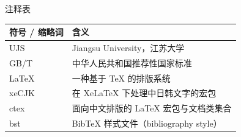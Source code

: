 
\clearpage
{}%
\thispagestyle{ujs@front}%
{}

\begin{center}
  \vspace{0.5\baselineskip}
  {\heiti{}注\hspace{1em}释\hspace{1em}表}
\end{center}
\par\vspace{\baselineskip}

\noindent
{\songti{}
  \renewcommand{\arraystretch}{1.3}%
  \begin{tabularx}{\textwidth}{@{}lL@{}}
    \toprule
    \textbf{符号 / 缩略词} & \textbf{含义} \\
    \midrule
    UJS      & Jiangsu University，江苏大学 \\
    GB/T     & 中华人民共和国推荐性国家标准 \\
    LaTeX    & 一种基于 \TeX{} 的排版系统 \\
    xeCJK    & 在 XeLaTeX 下处理中日韩文字的宏包 \\
    ctex     & 面向中文排版的 LaTeX 宏包与文档类集合 \\
    bst      & BibTeX 样式文件（bibliography style） \\
    \bottomrule
  \end{tabularx}
}
\clearpage
